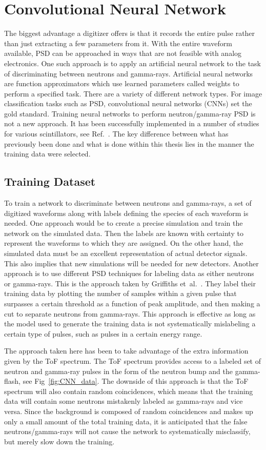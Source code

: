 \documentclass[main.tex]{subfiles}
\begin{document}
\section{Convolutional Neural Network}\label{sec:cnn}
The biggest advantage a digitizer offers is that it records the entire pulse rather than just extracting a few parameters from it. With the entire waveform available, PSD can be approached in ways that are not feasible with analog electronics. One such approach is to apply an artificial neural network to the task of discriminating between neutrons and gamma-rays. 
Artificial neural networks are function approximators which use learned parameters called weights to perform a specified task. There are a variety of different network types. For image classification tasks such as PSD, convolutional neural networks (CNNs) set the gold standard. Training neural networks to perform neutron/gamma-ray PSD is not a new approach. It has been successfully implemented in a number of studies for various scintillators, see Ref.~\cite{Griffiths}. The key difference between what has previously been done and what is done within this thesis lies in the manner the training data were selected.

\subsection{Training Dataset}
To train a network to discriminate between neutrons and gamma-rays, a set of digitized waveforms along with labels defining the species of each waveform is needed. One approach would be to create a precise simulation and train the network on the simulated data. Then the labels are known with certainty to represent the waveforms to which they are assigned. On the other hand, the simulated data must be an excellent representation of actual detector signals. This also implies that new simulations will be needed for new detectors. Another approach is to use different PSD techniques for labeling data as either neutrons or gamma-rays. This is the approach taken by  Griffiths et~al.~\cite{Griffiths}. They label their training data by plotting the number of samples within a given pulse that surpasses a certain threshold as a function of peak amplitude, and then making a cut to separate neutrons from gamma-rays. This approach is effective as long as the model used to generate the training data is not systematically mislabeling a certain type of pulses, such as pulses in a certain energy range. 

The approach taken here has been to take advantage of the extra information given by the ToF spectrum. The ToF spectrum provides access to a labeled set of neutron and gamma-ray pulses in the form of the neutron bump and the gamma-flash, see Fig~\ref{fig:CNN_data}. The downside of this approach is that the ToF spectrum will also contain random coincidences, which means that the training data will contain some neutrons mistakenly labeled as gamma-rays and vice versa. Since the background is composed of random coincidences and makes up only a small amount of the total training data, it is anticipated that the false neutrons/gamma-rays will not cause the network to systematically misclassify, but merely slow down the training.
\end{document}
